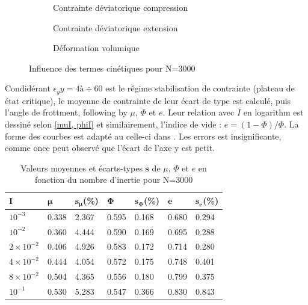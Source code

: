 \documentclass[5p,authoryear,square]{elsarticle}
\begin{document}
\begin{figure}[htbp]
    \centering
    \begin{subfigure}[b]{0.45\textwidth}
        \centering
        \scalebox{0.5}{}
        \caption{Contrainte déviatorique compression}
        \label{3000_comp}
    \end{subfigure}
        \begin{subfigure}[b]{0.45\textwidth}
                        \centering
        \scalebox{0.5}{}
        \caption{Contrainte déviatorique extension}
        \label{3000_ext}
    \end{subfigure}
    \begin{subfigure}[b]{0.45\textwidth}
                    \centering
        \scalebox{0.5}{}
        \caption{Déformation volumique}
        \label{300_cercle}
    \end{subfigure}
    \caption{Influence des termes cinétiques pour N=3000}
    \label{3000_Mohr}
\end{figure}
Condidérant $\epsilon_yy = 4à \div 60$ est le régime stabilisation de contrainte (plateau de état critique), le moyenne de contrainte de leur écart de type est calculé, puis l'angle de frottment, following by $\mu$, $\Phi$ et $e$.
Leur relation avec $I$ en logarithm est dessiné selon \cref{muI, phiI} et similairement, l'indice de vide : $e = (1-\Phi)/\Phi$.
La forme des courbes est adapté au celle-ci dans \cite{da2005rheophysics}.  
Les errors est insignificante, comme once peut observé que l'écart de l'axe y est petit.

\begin{table}[htbp]
\centering
\small
\begin{tabular}{@{}lllllll@{}}
\toprule
\textbf{I} & $\boldsymbol{\mu}$ & $\boldsymbol{s_{\mu}}$(\%) & $\boldsymbol{\Phi}$ & $\boldsymbol{s_{\Phi}}$(\%) & $\boldsymbol{e}$ & $\boldsymbol{s_{e}}$(\%) \\
\midrule
$10^{-3}$ & 0.338 & 2.367 & 0.595 & 0.168 & 0.680 & 0.294 \\
$10^{-2}$ & 0.360 & 4.444 & 0.590 & 0.169 & 0.695 & 0.288 \\
$2 \times 10^{-2}$ & 0.406 & 4.926 & 0.583 & 0.172 & 0.714 & 0.280 \\
$4 \times 10^{-2}$ & 0.444 & 4.054 & 0.572 & 0.175 & 0.748 & 0.401 \\
$8 \times 10^{-2}$ & 0.504 & 4.365 & 0.556 & 0.180 & 0.799 & 0.375 \\
$10^{-1}$ & 0.530 & 5.283 & 0.547 & 0.366 & 0.830 & 0.843 \\
\bottomrule
\end{tabular}
\caption{Valeurs moyennes et écarts-types $\boldsymbol{s}$ de $\mu$, $\Phi$ et $e$ en fonction du nombre d'inertie pour N=3000}
\label{table_rheologie_stats}
\end{table}
\end{document}
